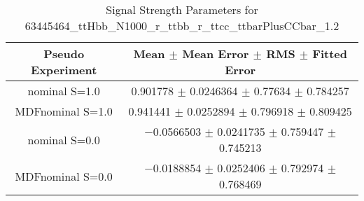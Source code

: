 \begin{table}
\centering
\caption{Signal Strength Parameters for 63445464\_ttHbb\_N1000\_r\_ttbb\_r\_ttcc\_ttbarPlusCCbar\_1.2}
\begin{tabular}{cc}
\toprule
Pseudo Experiment & Mean $\pm$ Mean Error $\pm$ RMS $\pm$ Fitted Error\\
\midrule
nominal S=1.0 & \num{0.901778} $\pm$ \num{0.0246364} $\pm$ \num{0.77634} $\pm$ \num{0.784257}\\
MDFnominal S=1.0 & \num{0.941441} $\pm$ \num{0.0252894} $\pm$ \num{0.796918} $\pm$ \num{0.809425}\\
nominal S=0.0 & \num{-0.0566503} $\pm$ \num{0.0241735} $\pm$ \num{0.759447} $\pm$ \num{0.745213}\\
MDFnominal S=0.0 & \num{-0.0188854} $\pm$ \num{0.0252406} $\pm$ \num{0.792974} $\pm$ \num{0.768469}\\
\bottomrule
\end{tabular}
\end{table}